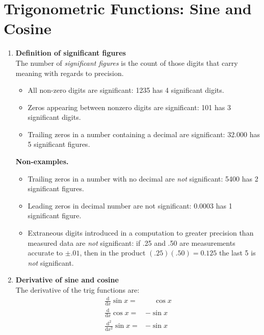 \section{Trigonometric Functions: Sine and Cosine}
\begin{enumerate}
    \item \textbf{Definition of significant figures}\\
        \indent The number of \textit{significant figures} is the count of those digits that carry meaning with regards to precision.\par
        \begin{eg}\leavevmode
            \begin{itemize}
                \item All non-zero digits are significant: 1235 has 4 significant digits.
                \item Zeros appearing between nonzero digits are significant: 101 has 3 significant digits.
                \item Trailing zeros in a number containing a decimal are significant: 32.000 has 5 significant figures.
            \end{itemize}
            \textsf{\textbf{\color{NavyBlue!70!Black}Non-examples.}}
            \begin{itemize}
                \item Trailing zeros in a number with no decimal are \textit{not} significant: 5400 has 2 significant figures.
                \item Leading zeros in decimal number are not significant: 0.0003 has 1 significant figure.
                \item Extraneous digits introduced in a computation to greater precision than measured data are \textit{not} significant: if .25 and .50 are measurements accurate to \(\pm.01\), then in the product \((.25)(.50)=0.125\) the last 5 is \textit{not} significant.
            \end{itemize}
        \end{eg}
    \item \textbf{Derivative of sine and cosine}\\
        \indent The derivative of the trig functions are:
        \begin{align*}
            \frac{\mathrm{d}}{\mathrm{d}x}\sin x= & \mathbin{\phantom{-}}\cos x\\
            \frac{\mathrm{d}}{\mathrm{d}x}\cos x= & -\sin x\\
            \frac{\mathrm{d}^2}{\mathrm{d}x^2}\sin x= & -\sin x\\

\end{align*}
\end{enumerate}
